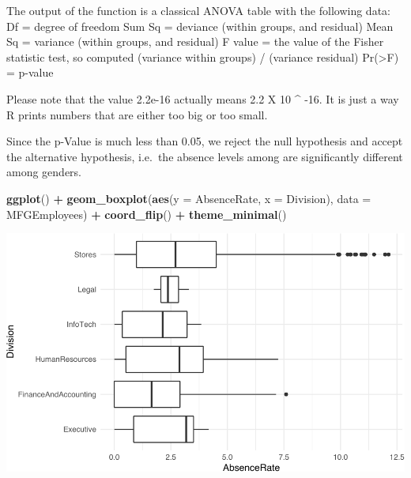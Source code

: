 \documentclass[12pt, krantz2,]{krantz}
\makeatletter
\newenvironment{Shaded}{\begin{snugshade}}{\end{snugshade}}
\newcommand{\DataTypeTok}[1]{\textcolor[rgb]{0.27,0.27,0.27}{#1}}
\newcommand{\FloatTok}[1]{\textcolor[rgb]{0.06,0.06,0.06}{#1}}
\newcommand{\KeywordTok}[1]{\textcolor[rgb]{0.27,0.27,0.27}{\textbf{#1}}}
\newcommand{\NormalTok}[1]{#1}
\newcommand{\OperatorTok}[1]{\textcolor[rgb]{0.43,0.43,0.43}{\textbf{#1}}}
\newcommand{\StringTok}[1]{\textcolor[rgb]{0.5,0.5,0.5}{#1}}
\newenvironment{kframe}{%
\medskip{}
\setlength{\fboxsep}{.8em}
 \def\at@end@of@kframe{}%
 \ifinner\ifhmode%
  \def\at@end@of@kframe{\end{minipage}}%
  \begin{minipage}{\columnwidth}%
 \fi\fi%
 \def\FrameCommand##1{\hskip\@totalleftmargin \hskip-\fboxsep
 \colorbox{shadecolor}{##1}\hskip-\fboxsep
     \hskip-\linewidth \hskip-\@totalleftmargin \hskip\columnwidth}%
 \MakeFramed {\advance\hsize-\width
   \@totalleftmargin\z@ \linewidth\hsize
   \@setminipage}}%
 {\par\unskip\endMakeFramed%
 \at@end@of@kframe}
\renewenvironment{Shaded}{\begin{kframe}}{\end{kframe}}
\makeatother
\begin{document}
The output of the function is a classical ANOVA table with the following data:
Df = degree of freedom
Sum Sq = deviance (within groups, and residual)
Mean Sq = variance (within groups, and residual)
F value = the value of the Fisher statistic test, so computed (variance within groups) / (variance residual)
Pr(\textgreater{}F) = p-value

Please note that the value 2.2e-16 actually means 2.2 X 10 \^{} -16. It is just a way R prints numbers that are either too big or too small.

Since the p-Value is much less than 0.05, we reject the null hypothesis and accept the alternative hypothesis, i.e.~the absence levels among are significantly different among genders.

\begin{Shaded}
\begin{Highlighting}[]
\KeywordTok{ggplot}\NormalTok{() }\OperatorTok{+}\StringTok{ }
\StringTok{  }\KeywordTok{geom_boxplot}\NormalTok{(}\KeywordTok{aes}\NormalTok{(}\DataTypeTok{y =}\NormalTok{ AbsenceRate, }\DataTypeTok{x =}\NormalTok{ Division), }\DataTypeTok{data =}\NormalTok{ MFGEmployees) }\OperatorTok{+}\StringTok{ }
\StringTok{  }\KeywordTok{coord_flip}\NormalTok{() }\OperatorTok{+}
\StringTok{  }\KeywordTok{theme_minimal}\NormalTok{()}
\end{Highlighting}
\end{Shaded}

\includegraphics[width=\textwidth]{hendrikfeddersen_files/figure-latex/unnamed-chunk-10-1}

\begin{Shaded}
\end{Shaded}
\end{document}
